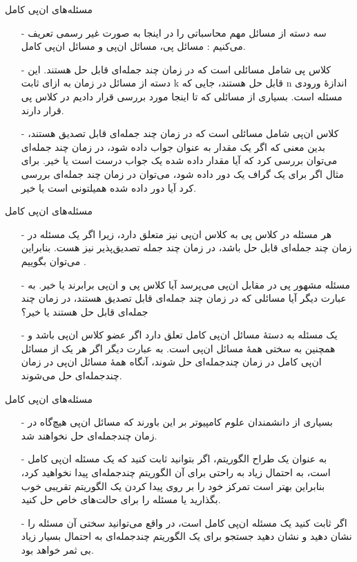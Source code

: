 \begin{frame}{مسئله‌های ان‌پی کامل}
\begin{itemize}\itemr
\item[-]
سه دسته از مسائل مهم محاسباتی را در اینجا به صورت غیر رسمی تعریف می‌کنیم : مسائل پی، مسائل ان‌پی و مسائل ان‌پی کامل.
\item[-]
کلاس پی
شامل مسائلی است که در زمان چند جمله‌ای 
قابل حل هستند. این دسته از مسائل در زمان
به ازای ثابت k قابل حل هستند، جایی که n اندازهٔ ورودی مسئله است. بسیاری از مسائلی که تا اینجا مورد بررسی قرار دادیم در کلاس پی قرار دارند.
\item[-]
کلاس ان‌پی
شامل مسائلی است که در زمان چند جمله‌ای قابل تصدیق
هستند، بدین معنی که اگر یک مقدار به عنوان جواب داده شود، در زمان چند جمله‌ای می‌توان بررسی کرد که آیا مقدار داده شده یک جواب درست است یا خیر. برای مثال اگر برای یک گراف یک دور داده شود، می‌توان در زمان چند جمله‌ای بررسی کرد آیا دور داده شده همیلتونی است یا خیر.
\end{itemize}
\end{frame}


\begin{frame}{مسئله‌های ان‌پی کامل}
\begin{itemize}\itemr
\item[-]
هر مسئله در کلاس پی به کلاس ان‌پی نیز متعلق دارد، زیرا اگر یک مسئله در زمان چند جمله‌ای قابل حل باشد، در زمان چند جمله تصدیق‌پذیر نیز هست. بنابراین می‌توان بگوییم
.
\item[-]
مسئله مشهور پی در مقابل ان‌پی
می‌پرسد آیا کلاس پی و ان‌پی برابرند یا خیر. به عبارت دیگر آیا مسائلی که در زمان چند جمله‌ای قابل تصدیق هستند، در زمان چند جمله‌ای قابل حل هستند یا خیر؟
\item[-]
یک مسئله به دستهٔ مسائل ان‌پی کامل
تعلق دارد اگر عضو کلاس ان‌پی باشد و همچنین به سختی همهٔ مسائل ان‌پی است. 
به عبارت دیگر اگر هر یک از مسائل ان‌پی کامل در زمان چند‌جمله‌ای حل شوند، آنگاه همهٔ مسائل ان‌پی در زمان چند‌جمله‌ای حل می‌شوند.
\end{itemize}
\end{frame}


\begin{frame}{مسئله‌های ان‌پی کامل}
\begin{itemize}\itemr
\item[-]
بسیاری از دانشمندان علوم کامپیوتر بر این باورند که مسائل ان‌پی هیچ‌گاه در زمان چند‌جمله‌ای حل نخواهند شد.
\item[-]
به عنوان یک طراح الگوریتم، اگر بتوانید ثابت کنید که یک مسئله ان‌پی کامل است، به احتمال زیاد به راحتی برای آن الگوریتم چندجمله‌ای پیدا نخواهید کرد، بنابراین بهتر است تمرکز خود را بر روی پیدا کردن یک الگوریتم تقریبی خوب بگذارید یا مسئله را برای حالت‌های خاص حل کنید.
\item[-]
اگر ثابت کنید یک مسئله ان‌پی کامل است، در واقع می‌توانید سختی آن مسئله را نشان دهید و نشان دهید جستجو برای یک الگوریتم چندجمله‌ای به احتمال بسیار زیاد بی ثمر خواهد بود.
\end{itemize}
\end{frame}


